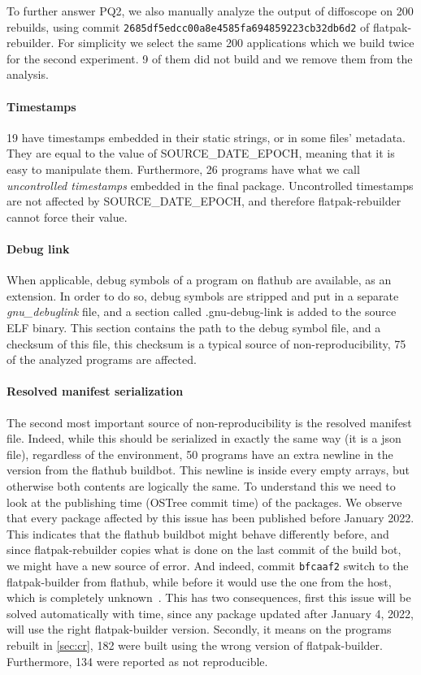 \documentclass[a4paper,11pt,oneside]{report}
\theoremstyle{definition}
\newcommand{\sysname}{flatpak-rebuilder\xspace}
\newcommand{\fh}{flathub\xspace}
\newcommand{\fb}{flatpak-builder\xspace}
\newcommand{\sde}{SOURCE\_DATE\_EPOCH\xspace}
\newcommand{\fhbb}{flathub buildbot\xspace}
\newcommand{\dfc}{diffoscope\xspace}
\newcommand{\ot}{OSTree\xspace}
\begin{document}
\noindent
To further answer PQ2, we also manually analyze the output of \dfc on 200 rebuilds,
using commit \verb|2685df5edcc00a8e4585fa694859223cb32db6d2| of \sysname. For
simplicity we select the same 200 applications which we build twice for the
second experiment. 9 of them did not build and we remove them from the analysis.

\paragraph*{Timestamps}
19 have timestamps embedded in their static strings, or in some files'
metadata. They are equal to the value of \sde, meaning that it is easy to
manipulate them. Furthermore, 26 programs have what we call \emph{uncontrolled
timestamps} embedded in the final package. Uncontrolled timestamps are not
affected by \sde, and therefore \sysname cannot force their value.

\paragraph*{Debug link}
When applicable, debug symbols of a program on \fh are available, as an
extension. In order to do so, debug symbols are stripped and put in a separate
\emph{gnu\_debuglink} file, and a section called .gnu-debug-link is added to
the source ELF binary. This section contains the path to the debug symbol file,
and a checksum of this file, this checksum is a typical source of
non-reproducibility, 75 of the analyzed programs are affected.

\paragraph*{Resolved manifest serialization}
The second most important source of non-reproducibility is the resolved
manifest file. Indeed, while this should be serialized in exactly the same way
(it is a json file), regardless of the environment, 50 programs have an extra
newline in the version from the \fhbb. This newline is inside every empty
arrays, but otherwise both contents are logically the same. To understand this
we need to look at the publishing time (\ot commit time) of the packages. We
observe that every package affected by this issue has been published before
January 2022. This indicates that the \fhbb might behave differently before,
and since \sysname copies what is done on the last commit of the build bot, we
might have a new source of error. And indeed, commit \verb|bfcaaf2| switch to
the \fb from \fh, while before it would use the one from the host, which is
completely unknown~\cite{gh:ptdr}. This has two consequences, first this issue
will be solved automatically with time, since any package updated after January
4, 2022, will use the right \fb version. Secondly, it means on the programs
rebuilt in \autoref{sec:cr}, 182 were built using the wrong version of \fb.
Furthermore, 134 were reported as not reproducible.
\end{document}
